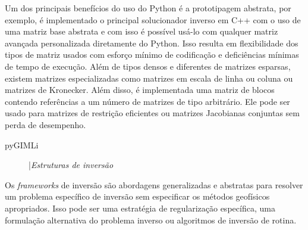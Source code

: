 \documentclass[a4paper, 12 pt]{article} %
\begin{document}
Um dos principais benefícios do uso do Python é a prototipagem abstrata, por exemplo, é implementado o principal solucionador inverso em C++ com o uso de uma matriz base abstrata e com isso é possível usá-lo com qualquer matriz avançada personalizada diretamente do Python. Isso resulta em flexibilidade dos tipos de matriz usados com esforço mínimo de codificação e deficiências mínimas de tempo de execução. Além de tipos densos e diferentes de matrizes esparsas, existem matrizes especializadas como matrizes em escala de linha ou coluna ou matrizes de Kronecker. Além disso, é implementada uma matriz de blocos contendo referências a um número de matrizes de tipo arbitrário. Ele pode ser usado para matrizes de restrição eficientes ou matrizes Jacobianas conjuntas sem perda de desempenho.
\\

\begin{description}
	\item[pyGIMLi] |\textit{Estruturas de inversão} 
\end{description}

Os \textit{frameworks} de inversão são abordagens generalizadas e abstratas para resolver um problema específico de inversão sem especificar os métodos geofísicos apropriados. Isso pode ser uma estratégia de regularização específica, uma formulação alternativa do problema inverso ou algoritmos de inversão de rotina.
\end{document}
